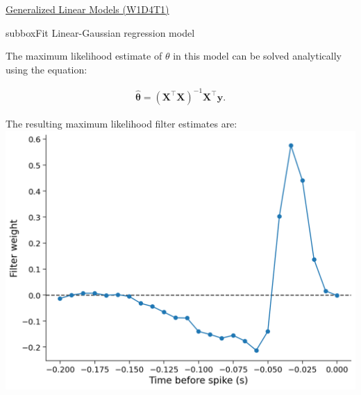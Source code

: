 \begin{textbox}{\href{https://compneuro.neuromatch.io/tutorials/W1D4_GeneralizedLinearModels/student/W1D4_Tutorial1.html}{Generalized Linear Models (W1D4T1)} }
\begin{subbox}{subbox}{Fit Linear-Gaussian regression model 
}
\scriptsize{The maximum likelihood estimate of $\theta$ in this model can be solved analytically using the equation:

\begin{align}
\boldsymbol{\hat \theta} = (\mathbf{X}^{\top}\mathbf{X})^{-1}\mathbf{X}^{\top}\mathbf{y}.
\end{align}}
The resulting maximum likelihood filter estimates are:
\centering
\includegraphics[scale=0.2]{Figures/GLM/GLMFigure2.png}
\end{subbox}
\end{textbox}
